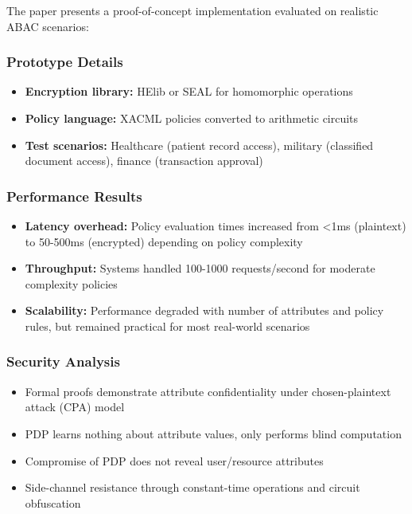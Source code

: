 The paper presents a proof-of-concept implementation evaluated on realistic ABAC scenarios:

\subsubsection{Prototype Details}

\begin{itemize}
    \item \textbf{Encryption library:} HElib or SEAL for homomorphic operations
    \item \textbf{Policy language:} XACML policies converted to arithmetic circuits
    \item \textbf{Test scenarios:} Healthcare (patient record access), military (classified document access), finance (transaction approval)
\end{itemize}

\subsubsection{Performance Results}

\begin{itemize}
    \item \textbf{Latency overhead:} Policy evaluation times increased from <1ms (plaintext) to 50-500ms (encrypted) depending on policy complexity
    \item \textbf{Throughput:} Systems handled 100-1000 requests/second for moderate complexity policies
    \item \textbf{Scalability:} Performance degraded with number of attributes and policy rules, but remained practical for most real-world scenarios
\end{itemize}

\subsubsection{Security Analysis}

\begin{itemize}
    \item Formal proofs demonstrate attribute confidentiality under chosen-plaintext attack (CPA) model
    \item PDP learns nothing about attribute values, only performs blind computation
    \item Compromise of PDP does not reveal user/resource attributes
    \item Side-channel resistance through constant-time operations and circuit obfuscation
\end{itemize}

